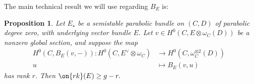 \documentclass[12 pt]{amsart}
\theoremstyle{plain}
\newtheorem{proposition}[subsubsection]{Proposition}
\theoremstyle{definition}
\theoremstyle{remark}
\numberwithin{equation}{section}
\begin{document}


The main technical result we will use regarding $B_E$ is:
\begin{proposition}\label{proposition:pairing-result}
	Let $E_\star$ be a semistable parabolic bundle on $(C,D)$ of parabolic
	degree zero, with underlying vector bundle $E$. Let $v\in H^0(C, E\otimes \omega_C(D))$ be a nonzero global section, and suppose the map 
\begin{align*}
	H^0(C, B_E(v,-)): H^0(C, E^\vee \otimes \omega_C) & \rightarrow H^0(C, \omega_C^{\otimes 2}(D)) \\
	u & \mapsto B_E(v,u)
\end{align*}
has rank $r$. Then $\on{rk}(E)\geq g-r.$
\end{proposition}
\end{document}
